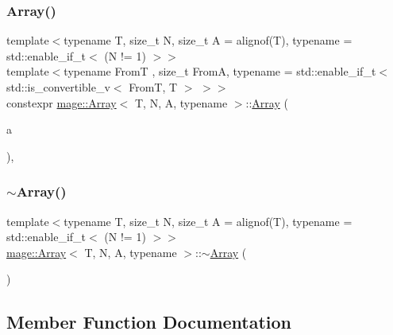 \subsubsection{\texorpdfstring{Array()}{Array()}\hspace{0.1cm}{\footnotesize\ttfamily [10/10]}}
{\footnotesize\ttfamily template$<$typename T, size\+\_\+t N, size\+\_\+t A = alignof(\+T), typename  = std\+::enable\+\_\+if\+\_\+t$<$ (\+N != 1) $>$$>$ \\
template$<$typename FromT , size\+\_\+t FromA, typename  = std\+::enable\+\_\+if\+\_\+t$<$ std\+::is\+\_\+convertible\+\_\+v$<$ From\+T, T $>$ $>$$>$ \\
constexpr \mbox{\hyperlink{structmage_1_1_array}{mage\+::\+Array}}$<$ T, N, A, typename $>$\+::\mbox{\hyperlink{structmage_1_1_array}{Array}} (\begin{DoxyParamCaption}\item[{const \mbox{\hyperlink{structmage_1_1_array}{Array}}$<$ FromT, N, FromA $>$ \&}]{a }\end{DoxyParamCaption})\hspace{0.3cm}{\ttfamily [explicit]}, {\ttfamily [noexcept]}}

\mbox{\label{structmage_1_1_array_a7adc09166915789b93a7a3af118182e0}} 
\subsubsection{\texorpdfstring{$\sim$\+Array()}{~Array()}}
{\footnotesize\ttfamily template$<$typename T, size\+\_\+t N, size\+\_\+t A = alignof(\+T), typename  = std\+::enable\+\_\+if\+\_\+t$<$ (\+N != 1) $>$$>$ \\
\mbox{\hyperlink{structmage_1_1_array}{mage\+::\+Array}}$<$ T, N, A, typename $>$\+::$\sim$\mbox{\hyperlink{structmage_1_1_array}{Array}} (\begin{DoxyParamCaption}{ }\end{DoxyParamCaption})\hspace{0.3cm}{\ttfamily [default]}}



\subsection{Member Function Documentation}
\mbox{\label{structmage_1_1_array_a693f811869bcaae12b5308981682affa}} 
